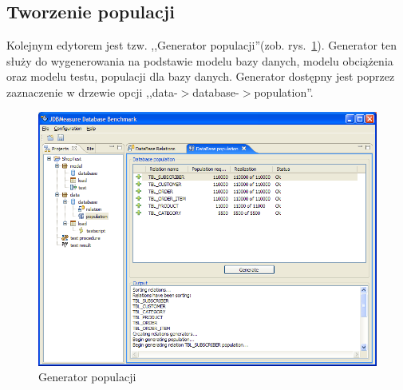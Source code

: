\subsection{Tworzenie populacji}
Kolejnym edytorem jest tzw. ,,Generator populacji''(zob. rys.~\ref{rys:populationgenerator}). 
Generator ten służy do wygenerowania na podstawie modelu bazy danych, modelu obciążenia 
oraz modelu testu, populacji dla bazy danych. Generator dostępny jest poprzez 
zaznaczenie w drzewie opcji ,,data-$>$database-$>$population''.
\begin{figure}[h]
\begin{center}
\includegraphics[width=0.9\linewidth]{figures/gui/21.png}
\end{center}
\caption{Generator populacji}\label{rys:populationgenerator}
\end{figure}

